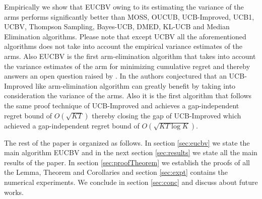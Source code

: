 Empirically we show that EUCBV owing to its estimating the variance of the arms performs significantly better than MOSS, OUCUB, UCB-Improved, UCB1, UCBV, Thompson Sampling, Bayes-UCB, DMED, KL-UCB and Median Elimination algorithms. Please note that except UCBV all the aforementioned algorithms does not take into account the empirical variance estimates of the arms. Also EUCBV is the first arm-elimination algorithm that takes into account the variance estimates of the arm for minimizing cumulative regret and thereby answers an open question raised by \citet{auer2010ucb}. In \citet{auer2010ucb} the authors conjectured that an UCB-Improved like arm-elimination algorithm can greatly benefit by taking into consideration the variance of the arms. Also it is the first algorithm that follows the same proof technique of UCB-Improved and achieves a gap-independent regret bound of $O\left( \sqrt{KT} \right)$ thereby closing the gap of UCB-Improved \citep{auer2010ucb} which achieved a gap-independent regret bound of $O\left( \sqrt{KT\log K} \right)$. 
	
	The rest of the paper is organized as follows. In section \ref{sec:eucbv} we state the main algorithm EUCBV and in the next section \ref{sec:results} we state all the main results of the paper. In  section \ref{sec:proofTheorem} we establish the proofs of all the Lemma, Theorem and Corollaries and section \ref{sec:expt} contains the numerical experiments. We conclude in section \ref{sec:conc} and discuss about future works.
